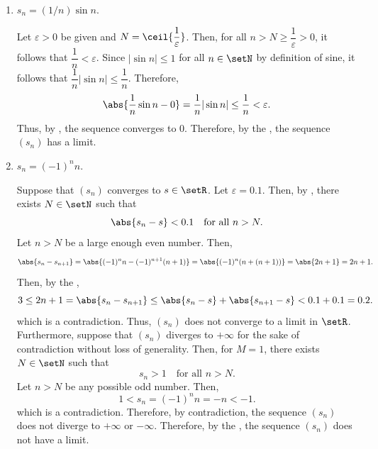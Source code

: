 \begin{enumerate}
\begin{enumerate}
    \item \(s_n=(1/n)\sin n\).
    \begin{subprove}
      Let \(\varepsilon>0\) be given and 
      \(N=\ceil{\dfrac{1}{\varepsilon}}\).
      Then, for all \(n > N \ge \dfrac{1}{\varepsilon} > 0\), 
      it follows that \(\dfrac{1}{n} < \varepsilon\).
      Since \(|\sin n| \leq 1\) for all \(n \in \setN\) by definition of sine,
      it follows that \(\dfrac{1}{n}|\sin n| \leq \dfrac{1}{n}\).
      Therefore,
      \[
        \abs{\dfrac{1}{n}\sin n - 0} = \dfrac{1}{n}|\sin n| \leq \dfrac{1}{n} < \varepsilon.
      \]
      Thus, by , the sequence converges to \(0\).
      Therefore, by the , the sequence \((s_n)\) has a limit.
    \end{subprove}

    \item \(s_n=(-1)^n n\).
    \begin{subprove}
      Suppose that \((s_n)\) converges to \(s \in \setR\).
      Let \(\varepsilon = 0.1\). Then,
      by , there exists \(N \in \setN\) such that
      \[
        \abs{s_n - s} < 0.1 \quad\text{for all } n > N.
      \]
      Let \(n > N\) be a large enough even number. Then,
      \[
        \abs{s_n - s_{n+1}} = \abs{(-1)^n n - (-1)^{n+1}(n+1)} = \abs{(-1)^n (n + (n+1))} = \abs{2n+1} = 2n+1.
      \]
      Then, by the ,
      \[
        3 \le 2n+1 = \abs{s_n - s_{n+1}} \leq \abs{s_n - s} + \abs{s_{n+1} - s} < 0.1 + 0.1 = 0.2.
      \]
      which is a contradiction.
      Thus, \((s_n)\) does not converge to a limit in \(\setR\).
      Furthermore, suppose that \((s_n)\) diverges to \(+\infty\) for the sake of contradiction without loss of generality.
      Then, for \(M = 1\), there exists \(N \in \setN\) such that
      \[
        s_n > 1 \quad\text{for all } n > N.
      \]
      Let \(n > N\) be any possible odd number. Then,
      \[
        1 < s_n = (-1)^n n = -n < -1.
      \]
      which is a contradiction. Therefore, by contradiction, the sequence \((s_n)\) does not diverge 
      to \(+\infty\) or \(-\infty\).
      Therefore, by the , the sequence \((s_n)\) does not have a limit.
    \end{subprove}
  \end{enumerate}


  \newpage


\end{enumerate}
